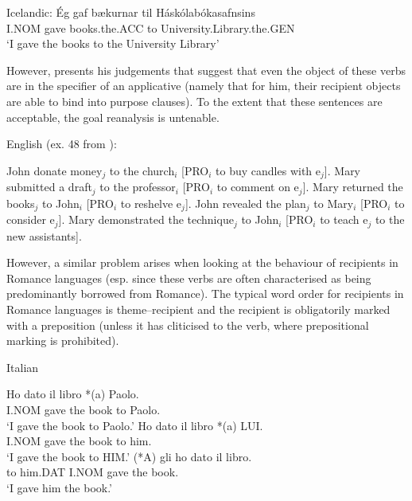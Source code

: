 \begin{exe}
	 Icelandic:
	\gll \'{E}g gaf b\ae kurnar til H\'ask\'olab\'okasafnsins\\
	I.NOM gave books.the.ACC to University.Library.the.GEN\\
	\trans `I gave the books to the University Library'
\end{exe}

However, \cite{Hallman.2015} presents his judgements that suggest that even the object of these verbs are in the specifier of an applicative (namely that for him, their recipient objects are able to bind into purpose clauses). To the extent that these sentences are acceptable, the goal reanalysis is untenable.

\begin{exe}
	\ex English (ex. 48 from \citealt{Hallman.2015}):
	\begin{xlist}
		\ex John donate money$_{j}$ to the church$_{i}$ [PRO$_{i}$ to buy candles with e$_{j}$].
		\ex Mary submitted a draft$_{j}$ to the professor$_{i}$ [PRO$_{i}$ to comment on e$_{j}$].
		\ex Mary returned the books$_{j}$ to John$_{i}$ [PRO$_{i}$ to reshelve e$_{j}$].
		\ex John revealed the plan$_{j}$ to Mary$_{i}$ [PRO$_{i}$ to consider e$_{j}$].
		\ex Mary demonstrated the technique$_{j}$ to John$_{i}$ [PRO$_{i}$ to teach e$_{j}$ to the new assistants].
	\end{xlist}
\end{exe}

However, a similar problem arises when looking at the behaviour of recipients in Romance languages (esp. since these verbs are often characterised as being predominantly borrowed from Romance). The typical word order for recipients in Romance languages is theme--recipient and the recipient is obligatorily marked with a preposition (unless it has cliticised to the verb, where prepositional marking is prohibited).

\begin{exe}
\ex Italian \citep[sec. 4.3.1]{Proudfoot.2013}
\begin{xlist}
\ex \gll Ho dato il libro *(a) Paolo.\\
I.NOM gave the book to Paolo.\\
\trans `I gave the book to Paolo.'
\ex \gll Ho dato il libro *(a) LUI.\\
I.NOM gave the book to him.\\
\trans `I gave the book to HIM.'
\ex \gll (*A) gli ho dato il libro.\\
to him.DAT I.NOM gave the book.\\
\trans `I gave him the book.'
\end{xlist}
\end{exe}%

